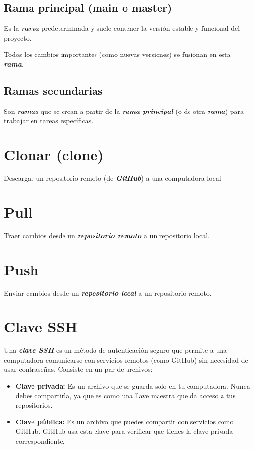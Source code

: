 \documentclass[10pt,a4paper]{book}
\begin{document}
\subsection{Rama principal (main o master)}
Es la \textbf{\textit{rama}} predeterminada y suele contener la versión estable y funcional del proyecto.

Todos los cambios importantes (como nuevas versiones) se fusionan en esta \textit{\textbf{rama}}.

\subsection{Ramas secundarias}
Son \textbf{\textit{ramas}} que se crean a partir de la \textbf{\textit{rama principal}} (o de otra \textbf{\textit{rama}}) para trabajar en tareas específicas.

\newpage

\section{Clonar (clone)}
Descargar un repositorio remoto (de \textbf{\textit{GitHub}}) a una computadora local.

\section{Pull}
Traer cambios desde un \textbf{\textit{repositorio remoto}} a un repositorio local.

\section{Push}
Enviar cambios desde un \textbf{\textit{repositorio local}} a un repositorio remoto.

\section{Clave SSH}
Una \textbf{\textit{clave SSH}} es un método de autenticación seguro que permite a una computadora comunicarse con servicios remotos (como GitHub) sin necesidad de usar contraseñas. Consiste en un par de archivos:
\begin{itemize}
	\item \textbf{Clave privada:} Es un archivo que se guarda solo en tu computadora. Nunca debes compartirla, ya que es como una llave maestra que da acceso a tus repositorios.
	\item \textbf{Clave pública:} Es un archivo que puedes compartir con servicios como GitHub. GitHub usa esta clave para verificar que tienes la clave privada correspondiente.
\end{itemize}
\end{document}
